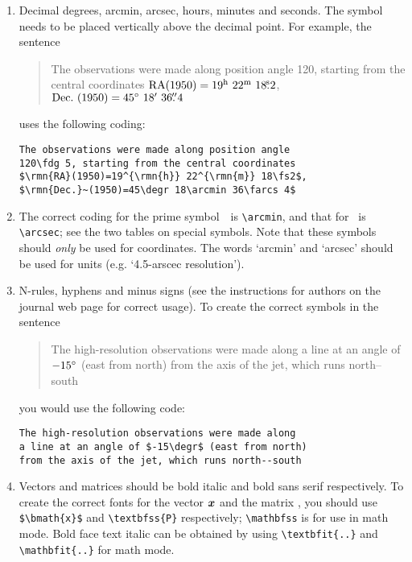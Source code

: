 \documentclass[useAMS,usenatbib]{mn2e}
\begin{document}
\begin{enumerate}
\item Decimal degrees, arcmin, arcsec, hours, minutes and seconds.
The symbol needs to be placed vertically above the decimal point.
For example, the sentence
%
\begin{quote}
The observations were made along position angle 120,
starting from the central coordinates
$\rmn{RA}(1950)=19^{\rmn{h}}~22^{\rmn{m}}~18\fs2$,
${\mathrm{Dec.}}~(1950)=45\hbox{$^\circ$}~18\hbox{$^\prime$}~36\hbox{$.\!\!^{\prime\prime}$} 4$
\end{quote}
%
uses the following coding:
%
\begin{verbatim}
The observations were made along position angle
120\fdg 5, starting from the central coordinates
$\rmn{RA}(1950)=19^{\rmn{h}} 22^{\rmn{m}} 18\fs2$,
$\rmn{Dec.}~(1950)=45\degr 18\arcmin 36\farcs 4$
\end{verbatim}

\item The correct coding for the prime symbol~\arcmin\ is
\verb"\arcmin", and that for \arcsec\ is \verb"\arcsec"; see the
two tables on special symbols. Note that these symbols should
\emph{only} be used for coordinates. The words `arcmin' and
`arcsec' should be used for units (e.g. `4.5-arscec resolution').

\item N-rules, hyphens and minus signs (see the instructions for
authors on the journal web page for
correct usage). To create the correct symbols in the sentence
%
\begin{quote}
The high-resolution observations were made along a line at an
angle of $-15\hbox{$^\circ$}$ (east from north) from the axis of the jet,
which runs north--south
\end{quote}
you would use the following code:
%
\begin{verbatim}
The high-resolution observations were made along
a line at an angle of $-15\degr$ (east from north)
from the axis of the jet, which runs north--south
\end{verbatim}

\item Vectors and matrices should be bold italic and bold sans
serif respectively. To create the correct fonts for the vector $\bmath{x}$
and the matrix , you should use \verb"$\bmath{x}$" and
\verb"\textbfss{P}" respectively; \verb"\mathbfss" is for use in
math mode. Bold face text italic can be obtained by using
\verb"\textbfit{..}" and \verb"\mathbfit{..}" for math mode.


\end{enumerate}
\end{document}
